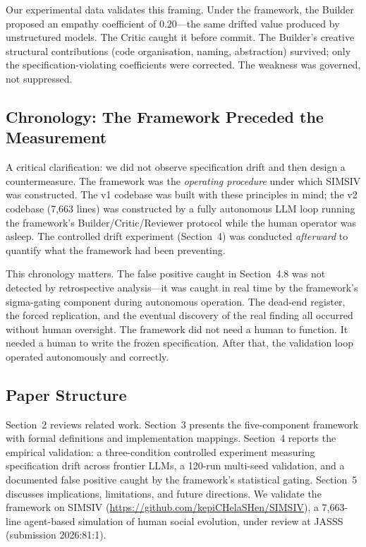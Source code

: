 \documentclass[11pt,a4paper]{article}
\begin{document}
Our experimental data validates this framing. Under the framework, the Builder proposed an empathy coefficient of 0.20---the same drifted value produced by unstructured models. The Critic caught it before commit. The Builder's creative structural contributions (code organisation, naming, abstraction) survived; only the specification-violating coefficients were corrected. The weakness was governed, not suppressed.

\subsection{Chronology: The Framework Preceded the Measurement}

A critical clarification: we did not observe specification drift and then design a countermeasure. The framework was the \textit{operating procedure} under which SIMSIV was constructed. The v1 codebase was built with these principles in mind; the v2 codebase (7,663 lines) was constructed by a fully autonomous LLM loop running the framework's Builder/Critic/Reviewer protocol while the human operator was asleep. The controlled drift experiment (Section~4) was conducted \textit{afterward} to quantify what the framework had been preventing.

This chronology matters. The false positive caught in Section~4.8 was not detected by retrospective analysis---it was caught in real time by the framework's sigma-gating component during autonomous operation. The dead-end register, the forced replication, and the eventual discovery of the real finding all occurred without human oversight. The framework did not need a human to function. It needed a human to write the frozen specification. After that, the validation loop operated autonomously and correctly.

\subsection{Paper Structure}

Section~2 reviews related work. Section~3 presents the five-component framework with formal definitions and implementation mappings. Section~4 reports the empirical validation: a three-condition controlled experiment measuring specification drift across frontier LLMs, a 120-run multi-seed validation, and a documented false positive caught by the framework's statistical gating. Section~5 discusses implications, limitations, and future directions. We validate the framework on SIMSIV (\url{https://github.com/kepiCHelaSHen/SIMSIV}), a 7,663-line agent-based simulation of human social evolution, under review at JASSS (submission 2026:81:1).
\end{document}

